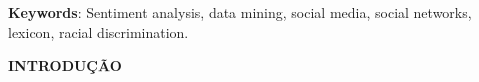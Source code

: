 \documentclass[12pt, a4paper]{article}
\begin{document}
\textbf{Keywords}: Sentiment analysis, data mining, social media, social networks, lexicon, racial discrimination.



\newpage
\pagestyle{empty}
\vspace*{4cm}
\listoffigures
\clearpage



\newpage
\pagestyle{empty}
\vspace*{3.5cm}
\renewcommand{\contentsname}{\begin{center}\textbf{\normalsize SUMÁRIO}\vspace{36pt}\end{center}}
\tableofcontents
\clearpage
\pagestyle{myheadings}

\newpage
\vspace*{4cm}




\setcounter{page}{7}
\begin{center}
\textbf{INTRODUÇÃO\\}
\end{center}
\par
{}	
\end{document}
